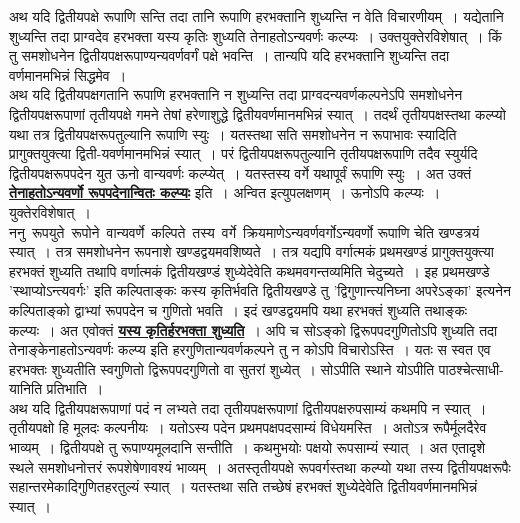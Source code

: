 \documentclass[11pt, openany]{book}
\begin{document}
\vspace{-4mm}
 अथ यदि द्वितीयपक्षे रूपाणि सन्ति तदा तानि रूपाणि हरभक्तानि
शुध्यन्ति न वेति विचारणीयम्~। यद्येतानि शुध्यन्ति तदा प्राग्वदेव हरभक्ता यस्य
कृतिः शुध्यति तेनाहतोऽन्यवर्णः कल्प्यः~। उक्तयुक्तेरविशेषात्~। किं तु समशोधनेन
द्वितीयपक्षरूपाण्यन्यवर्णवर्गं पक्षे भवन्ति~। तान्यपि यदि हरभक्तानि शुध्यन्ति
तदा वर्णमानमभिन्नं सिद्धमेव~। \\

\vspace{-4mm}
 अथ यदि द्वितीयपक्षगतानि रूपाणि हरभक्तानि न शुध्यन्ति तदा प्राग्वदन्यवर्णकल्पनेऽपि समशोधनेन द्वितीयपक्षरूपाणां तृतीयपक्षे गमने तेषां
हरेणाशुद्धे द्वितीयवर्णमानमभिन्नं  स्यात्~। तदर्थं तृतीयपक्षस्तथा कल्प्यो यथा तत्र
द्वितीयपक्षरूपतुल्यानि
 रूपाणि स्युः~। यतस्तथा सति समशोधनेन न रूपाभावः स्यादिति
प्रागुक्तयुक्त्या द्विती-यवर्णमानमभिन्नं स्यात्~। परं द्वितीयपक्षरूपतुल्यानि तृतीयपक्षरूपाणि तदैव स्युर्यदि द्वितीयपक्षरूपपदेन युत ऊनो वान्यवर्णः कल्प्येत्~। यतस्तस्य वर्गे यथापूर्वं रूपाणि स्युः~। अत उक्तं \hyperref[178]{\textbf{तेनाहतोऽन्यवर्णो रूपपदेनान्वितः कल्प्यः}} इति~। अन्वित इत्युपलक्षणम्~। ऊनोऽपि कल्प्यः~। युक्तेरविशेषात्~। \\

\vspace{-4mm}
 ननु \,रूपयुते \,रूपोने \,वान्यवर्णे \,कल्पिते \,तस्य \,वर्गे \,क्रियमाणेऽन्यवर्णवर्गोऽन्यवर्णो रूपाणि चेति खण्डत्रयं स्यात्~। तत्र समशोधनेन रूपनाशे
खण्डद्वयमवशिष्यते~। तत्र
 यद्यपि वर्गात्मकं प्रथमखण्डं प्रागुक्तयुक्त्या हरभक्तं शुध्यति तथापि
वर्णात्मकं  द्वितीयखण्डं शुध्येदेवेति कथमवगन्तव्यमिति चेदुच्यते~। इह प्रथमखण्डे
{\qt 'स्थाप्योऽन्त्यवर्गः'} इति कल्पिताङ्कः कस्य कृतिर्भवति द्वितीयखण्डे तु
{\qt 'द्विगुणान्त्यनिघ्ना अपरेऽङ्का'} इत्यनेन कल्पिताङ्को द्वाभ्यां रूपपदेन च गुणितो भवति~। इदं खण्डद्वयमपि यथा
\newpage
\noindent हरभक्तं शुध्यति तथाङ्कः कल्प्यः~। अत एवोक्तं \hyperref[178]{\textbf{यस्य कृतिर्हरभक्ता शुध्यति}}~।
 अपि च सोऽङ्को द्विरूपपदगुणितोऽपि शुध्यति तदा तेनाङ्केनाहतोऽन्यवर्णः
कल्प्य
 इति हरगुणितान्यवर्णकल्पने तु न कोऽपि विचारोऽस्ति~। यतः स स्वत एव
हरभक्तः 
शुध्यतीति स्वगुणितो द्विरूपपदगुणितो वा सुतरां शुध्येत्~। सोऽपीति स्थाने
योऽपीति पाठश्चेत्साधी-यानिति प्रतिभाति~। \\

\vspace{-4mm}
 अथ यदि द्वितीयपक्षरूपाणां पदं न लभ्यते तदा तृतीयपक्षरूपाणां
द्वितीयपक्षरुपसाम्यं कथमपि न स्यात्~। तृतीयपक्षो हि मूलदः कल्पनीयः~।
यतोऽस्य
 पदेन प्रथमपक्षपदसाम्यं विधेयमस्ति~। अतोऽत्र रूपैर्मूलदैरेव भाव्यम्~।
द्वितीयपक्षे
 तु रूपाण्यमूलदानि सन्तीति~। कथमुभयोः पक्षयो रूपसाम्यं स्यात्~। अत
एतादृशे स्थले 
समशोधनोत्तरं रूपशेषेणावश्यं भाव्यम्~। अतस्तृतीयपक्षे रूपवर्गस्तथा
कल्प्यो यथा 
तस्य द्वितीयपक्षरूपैः सहान्तरमेकादिगुणितहरतुल्यं स्यात्~। यतस्तथा सति
तच्छेषं
 हरभक्तं शुध्येदेवेति द्वितीयवर्णमानमभिन्नं स्यात्~। \\
\end{document}
